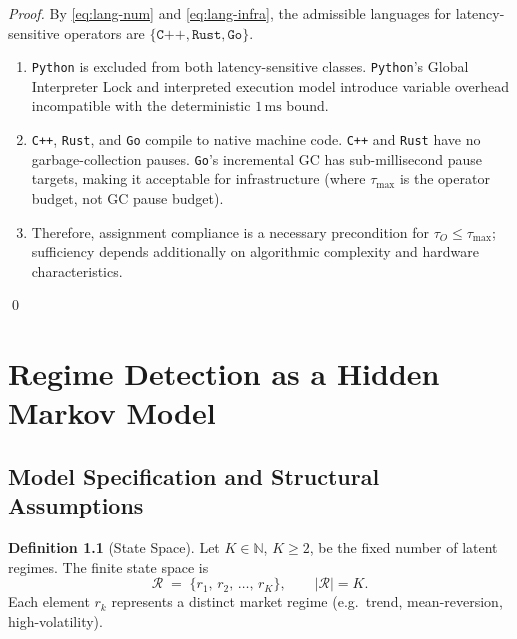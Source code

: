 \documentclass[12pt,openany]{book}
\numberwithin{equation}{chapter}
\theoremstyle{plain}
\theoremstyle{definition}
\newtheorem{definition}[theorem]{Definition}
\theoremstyle{remark}
\numberwithin{equation}{chapter}
\theoremstyle{plain}
\begin{document}
\begin{proof}
By \eqref{eq:lang-num} and \eqref{eq:lang-infra}, the admissible
languages for latency-sensitive operators are
$\{\texttt{C++}, \texttt{Rust}, \texttt{Go}\}$.
\begin{enumerate}
  \item \texttt{Python} is excluded from both latency-sensitive classes.
        \texttt{Python}'s Global Interpreter Lock and interpreted
        execution model introduce variable overhead incompatible with
        the deterministic $1\,\text{ms}$ bound.
  \item \texttt{C++}, \texttt{Rust}, and \texttt{Go} compile to native
        machine code.  \texttt{C++} and \texttt{Rust} have no
        garbage-collection pauses.  \texttt{Go}'s incremental GC has
        sub-millisecond pause targets, making it acceptable for
        infrastructure (where $\tau_{\max}$ is the operator budget, not
        GC pause budget).
  \item Therefore, assignment compliance is a necessary precondition for
        $\tau_O \leq \tau_{\max}$; sufficiency depends additionally on
        algorithmic complexity and hardware characteristics.
\end{enumerate}
\qed
\end{proof}

\chapter{Regime Detection as a Hidden Markov Model}
\label{ch:hmm}

\section{Model Specification and Structural Assumptions}
\label{sec:hmm-spec}

\begin{definition}[State Space]
\label{def:hmm-state-space}
Let $K \in \mathbb{N}$, $K \geq 2$, be the fixed number of latent regimes.
The finite state space is
\begin{equation}
  \mathcal{R} \;=\; \{r_1,\, r_2,\, \ldots,\, r_K\},
  \qquad |\mathcal{R}| = K.
  \label{eq:hmm-state-space}
\end{equation}
Each element $r_k$ represents a distinct market regime (e.g.\
trend, mean-reversion, high-volatility).
\end{definition}
\end{document}
